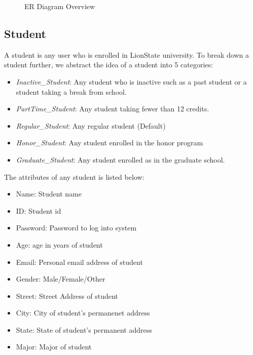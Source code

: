 \documentclass{article}
\begin{document}
\begin{figure}[H]
\begin{center}
{
    }
    \caption{ER Diagram Overview}\label{fig:Overview ER Diagram}
    \end{center}
    \end{figure}

  \subsection{Student}\label{sec:Concept:Student}
    A student is any user who is enrolled in LionState university.  To break down a student further, we abstract the idea of a student into 5 categories:
    \begin{itemize}
      \item \textit{Inactive\_Student}: Any student who is inactive such as a past student or a student taking a break from school.
      \item \textit{PartTime\_Student}: Any student taking fewer than 12 credits.
      \item \textit{Regular\_Student}: Any regular student (Default)
      \item \textit{Honor\_Student}: Any student enrolled in the honor program
      \item \textit{Graduate\_Student}: Any student enrolled as in the graduate school.
    \end{itemize}

    The attributes of any student is listed below:
    \begin{itemize}
      \item Name: Student name
      \item ID: Student id
      \item Password: Password to log into system
      \item Age: age in years of student
      \item Email: Personal email address of student
      \item Gender: Male/Female/Other
      \item Street: Street Address of student
      \item City: City of student's permanenet address
      \item State: State of student's permanent address
      \item Major: Major of student
    \end{itemize}
\end{document}
